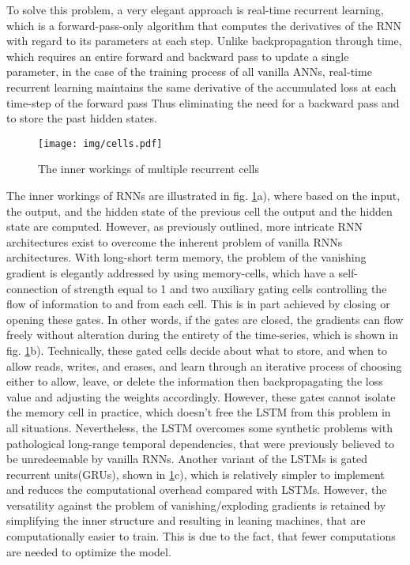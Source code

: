 			To solve this problem, a very elegant approach is real-time recurrent learning, which is a forward-pass-only algorithm that computes the derivatives of the RNN with regard to its parameters at each step. Unlike backpropagation through time, which requires an entire forward and backward pass to update a single parameter, in the case of the training process of all vanilla ANNs, real-time recurrent learning maintains the same derivative of the accumulated loss at each time-step of the forward pass Thus eliminating the need for a backward pass and to store the past hidden states\cite{hochreiter1997long}.\newline
			\begin{figure}[H]
				\begin{center}
					\texttt{[image: img/cells.pdf]}
					\caption{The inner workings of multiple recurrent cells}
					\label{fig:cells}
				\end{center}
			\end{figure}
			The inner workings of RNNs are illustrated in fig. \ref{fig:cells}a), where based on the input, the output, and the hidden state of the previous cell the output and the hidden state are computed. However, as previously outlined, more intricate RNN architectures exist to overcome the inherent problem of vanilla RNNs architectures. With long-short term memory, the problem of the vanishing gradient is elegantly addressed by using memory-cells, which have a self-connection of strength equal to 1 and two auxiliary gating cells controlling the flow of information to and from each cell. This is in part achieved by closing or opening these gates. In other words, if the gates are closed, the gradients can flow freely without alteration during the entirety of the time-series, which is shown in fig. \ref{fig:cells}b). Technically, these gated cells decide about what to store, and when to allow reads, writes, and erases, and learn through an iterative process of choosing either to allow, leave, or delete the information then backpropagating the loss value and adjusting the weights accordingly\cite{kumar2018energy}. However, these gates cannot isolate the memory cell in practice, which doesn't free the LSTM from this problem in all situations. Nevertheless, the LSTM overcomes some synthetic problems with pathological long-range temporal dependencies, that were previously believed to be unredeemable by vanilla RNNs\cite{sutskever2013training}.\newline
			Another variant of the LSTMs is gated recurrent units(GRUs), shown in \ref{fig:cells}c), which is relatively simpler to implement and reduces the computational overhead compared with LSTMs. However, the versatility against the problem of vanishing/exploding gradients is retained by simplifying the inner structure and resulting in leaning machines, that are computationally easier to train. This is due to the fact, that fewer computations are needed to optimize the model.\newline

